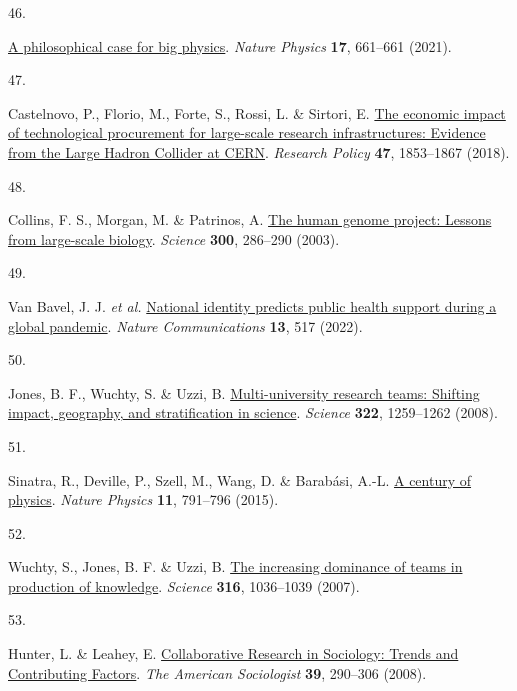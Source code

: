 \documentclass[
  man,floatsintext]{apa6}
\newlength{\cslhangindent}
\newlength{\csllabelwidth}
\newlength{\cslentryspacingunit} %
\newenvironment{CSLReferences}[2] %
 {%
  \setlength{\parindent}{0pt}
  \ifodd #1
  \let\oldpar\par
  \def\par{\hangindent=\cslhangindent\oldpar}
  \fi
  \setlength{\parskip}{#2\cslentryspacingunit}
 }%
 {}
\newcommand{\CSLLeftMargin}[1]{\parbox[t]{\csllabelwidth}{#1}}
\newcommand{\CSLRightInline}[1]{\parbox[t]{\linewidth - \csllabelwidth}{#1}\break}
\begin{document}
\begin{CSLReferences}{0}{0}
\leavevmode{}%
\CSLLeftMargin{46. }%
\CSLRightInline{\href{https://doi.org/10.1038/s41567-021-01278-0}{A philosophical case for big physics}. \emph{Nature Physics} \textbf{17}, 661--661 (2021).}

\leavevmode{}%
\CSLLeftMargin{47. }%
\CSLRightInline{Castelnovo, P., Florio, M., Forte, S., Rossi, L. \& Sirtori, E. \href{https://doi.org/10.1016/j.respol.2018.06.018}{The economic impact of technological procurement for large-scale research infrastructures: Evidence from the Large Hadron Collider at CERN}. \emph{Research Policy} \textbf{47}, 1853--1867 (2018).}

\leavevmode{}%
\CSLLeftMargin{48. }%
\CSLRightInline{Collins, F. S., Morgan, M. \& Patrinos, A. \href{https://doi.org/10.1126/science.1084564}{The human genome project: Lessons from large-scale biology}. \emph{Science} \textbf{300}, 286--290 (2003).}

\leavevmode{}%
\CSLLeftMargin{49. }%
\CSLRightInline{Van Bavel, J. J. \emph{et al.} \href{https://doi.org/10.1038/s41467-021-27668-9}{National identity predicts public health support during a global pandemic}. \emph{Nature Communications} \textbf{13}, 517 (2022).}

\leavevmode{}%
\CSLLeftMargin{50. }%
\CSLRightInline{Jones, B. F., Wuchty, S. \& Uzzi, B. \href{https://doi.org/10.1126/science.1158357}{Multi-university research teams: Shifting impact, geography, and stratification in science}. \emph{Science} \textbf{322}, 1259--1262 (2008).}

\leavevmode{}%
\CSLLeftMargin{51. }%
\CSLRightInline{Sinatra, R., Deville, P., Szell, M., Wang, D. \& Barabási, A.-L. \href{https://doi.org/10.1038/nphys3494}{A century of physics}. \emph{Nature Physics} \textbf{11}, 791--796 (2015).}

\leavevmode{}%
\CSLLeftMargin{52. }%
\CSLRightInline{Wuchty, S., Jones, B. F. \& Uzzi, B. \href{https://doi.org/10.1126/science.1136099}{The increasing dominance of teams in production of knowledge}. \emph{Science} \textbf{316}, 1036--1039 (2007).}

\leavevmode{}%
\CSLLeftMargin{53. }%
\CSLRightInline{Hunter, L. \& Leahey, E. \href{https://doi.org/10.1007/s12108-008-9042-1}{Collaborative Research in Sociology: Trends and Contributing Factors}. \emph{The American Sociologist} \textbf{39}, 290--306 (2008).}


\end{CSLReferences}
\end{document}

